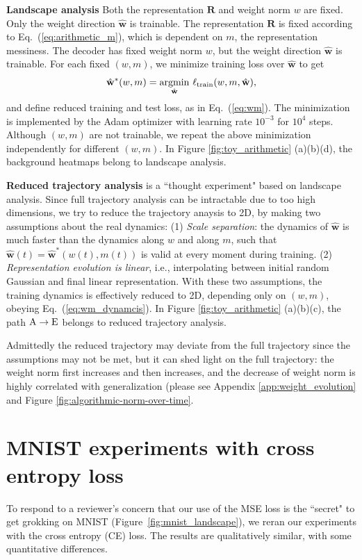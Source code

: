 \documentclass{article} %
\newcommand{\mat}[1]{\mathbf{#1}}
\begin{document}
{\bf Landscape analysis} Both the  representation $\mat{R}$ and weight norm $w$ are fixed. Only the weight direction $\hat{\mat{w}}$ is trainable. The representation $\mat{R}$ is fixed according to Eq.~(\ref{eq:arithmetic_m}), which is dependent on $m$, the representation messiness. The decoder has fixed weight norm $w$, but the weight direction $\hat{\mat{w}}$ is trainable. For each fixed $(w, m)$, we minimize training loss over $\hat{\mat{w}}$ to get
\begin{equation}
    \hat{\mat{w}}^*(w,m) = \underset{\hat{\mat{w}}}{\rm argmin}\ \ell_{\rm train}(w,m,\hat{\mat{w}}),
\end{equation}
and define reduced training and test loss, as in Eq.~(\ref{eq:wm}). The minimization is implemented by the Adam optimizer with learning rate $10^{-3}$ for $10^4$ steps. Although $(w, m)$ are not trainable, we repeat the above minimization independently for different $(w, m)$. In Figure \ref{fig:toy_arithmetic} (a)(b)(d), the background heatmaps belong to landscape analysis.

{\bf Reduced trajectory analysis} is a ``thought experiment" based on landscape analysis. Since full trajectory analysis can be intractable due to too high dimensions, we try to reduce the trajectory anaysis to 2D, by making two assumptions about the real dynamics: (1) \textit{Scale separation}: the dynamics of $\hat{\mat{w}}$ is much faster than the dynamics along $w$ and along $m$, such that $\hat{\mat{w}}(t)=\hat{\mat{w}}^*(w(t),m(t))$ is valid at every moment during training. (2) \textit{Representation evolution is linear}, i.e., interpolating between initial random Gaussian and final linear representation. With these two assumptions, the training dynamics is effectively reduced to 2D, depending only on $(w,m)$, obeying Eq.~(\ref{eq:wm_dynamcis}). In Figure \ref{fig:toy_arithmetic} (a)(b)(c), the path ${\rm A}\to {\rm E}$ belongs to reduced trajectory analysis. 

Admittedly the reduced trajectory may deviate from the full trajectory since the assumptions may not be met, but it can shed light on the full trajectory: the weight norm first increases and then increases, and the decrease of weight norm is highly correlated with generalization (please see Appendix \ref{app:weight_evolution} and Figure \ref{fig:algorithmic-norm-over-time}.


\section{MNIST experiments with cross entropy loss}\label{app:MNIST-CE}
To respond to a reviewer's concern that our use of the MSE loss is the ``secret" to get grokking on MNIST (Figure~\ref{fig:mnist_landscape}), we reran our experiments with the cross entropy (CE) loss. The results are qualitatively similar, with some quantitative differences.
\end{document}
